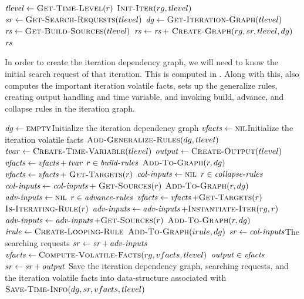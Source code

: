 \documentclass{article}
\begin{document}
\begin{codebox}
\li  $\id{tlevel} \gets \proc{Get-Time-Level}(r)$
\li  $\textnormal{\scshape Init-Iter}(rg,tlevel)$
\li  $\id{sr} \gets \proc{Get-Search-Requests}(tlevel)$
\li  $\id{dg} \gets \proc{Get-Iteration-Graph}(tlevel)$
\li  $\id{rs} \gets \proc{Get-Build-Sources}(tlevel)$
\li  $\id{rs} \gets \id{rs} +~\proc{Create-Graph}(rg,sr,tlevel,dg)$
\li  \Return $\id{rs}$
\end{codebox}

In order to create the iteration dependency graph, we will need to
know the initial search request of that iteration. This is computed in
. Along with this,  also computes the
important iteration volatile facts, sets up the generalize rules,
creating output handling and time variable, and invoking build,
advance, and collapse rules in the iteration graph. 

\begin{codebox}
\li  $\id{dg} \gets \const{empty}$\>\>\>\>\Comment Initialize the
iteration dependency graph
\li  $\id{vfacts} \gets \const{nil}$\>\>\>\>\Comment Initialize the
iteration volatile facts
\li  $\textnormal{\scshape Add-Generalize-Rules}(dg,tlevel)$
\li  $\id{tvar} \gets \proc{Create-Time-Variable}(tlevel)$
\li  $\id{output} \gets \proc{Create-Output}(tlevel)$
\li  $\id{vfacts} \gets \id{vfacts} + \id{tvar}$
\li  \For $r \in \id{build-rules}$
\li    \Do
          $\textnormal{\scshape Add-To-Graph}(r,dg)$
\li       $\id{vfacts} \gets \id{vfacts} +~\proc{Get-Targets}(r)$
     \End
\li  $\id{col-inputs} \gets \const{nil}$
\li  \For $r \in \id{collapse-rules}$
\li    \Do
          $\id{col-inputs} \gets \id{col-inputs}
           +~\proc{Get-Sources}(r)$
\li       $\textnormal{\scshape Add-To-Graph}(r,dg)$
     \End
\li  $\id{adv-inputs} \gets \const{nil}$
\li  \For $r \in \id{advance-rules}$
\li    \Do
          $\id{vfacts} \gets \id{vfacts} + \proc{Get-Targets}(r)$
\li       \If $\textnormal{\scshape Is-Iterating-Rule}(r)$
\li         \Then
               $\id{adv-inputs} \gets \id{adv-inputs} + 
               \proc{Instantiate-Iter}(rg,r)$
\li         \Else
               $\id{adv-inputs} \gets \id{adv-inputs} +
               \proc{Get-Sources}(r)$
\li            $\textnormal{\scshape Add-To-Graph}(r,dg)$
          \End
     \End
\li  $\id{irule} \gets \proc{Create-Looping-Rule}$\label{li:irule}
\li  $\textnormal{\scshape Add-To-Graph}(irule,dg)$
\li  $\id{sr} \gets \id{col-inputs}$\>\>\>\>\Comment The searching requests
\li  $\id{sr} \gets \id{sr} + \id{adv-inputs}$
\li  $\id{vfacts} \gets \proc{Compute-Volatile-Facts}(rg,vfacts,tlevel)$
\li  \If $\id{output} \in \id{vfacts}$\label{li:output1}
\li    \Then
          $\id{sr} \gets \id{sr} + \id{output}$\label{li:output2}
     \End
\li  \Comment Save the iteration dependency graph, searching requests, and the
\li  \Comment iteration volatile facts into data-structure
associated with 
\li  $\textnormal{\scshape Save-Time-Info}(dg,sr,vfacts,tlevel)$
\end{codebox}
\end{document}
